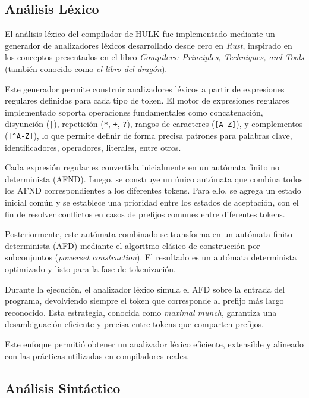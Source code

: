 \documentclass{article}
\begin{document}
\subsection{Análisis Léxico}

El análisis léxico del compilador de HULK fue implementado mediante un generador de analizadores léxicos desarrollado desde cero en \textit{Rust}, inspirado en los conceptos presentados en el libro \textit{Compilers: Principles, Techniques, and Tools} (también conocido como \textit{el libro del dragón}).

Este generador permite construir analizadores léxicos a partir de expresiones regulares definidas para cada tipo de token. El motor de expresiones regulares implementado soporta operaciones fundamentales como concatenación, disyunción (\texttt{|}), repetición (\texttt{*}, \texttt{+}, \texttt{?}), rangos de caracteres (\texttt{[A-Z]}), y complementos (\texttt{[\^{}A-Z]}), lo que permite definir de forma precisa patrones para palabras clave, identificadores, operadores, literales, entre otros.

Cada expresión regular es convertida inicialmente en un autómata finito no determinista (AFND). Luego, se construye un único autómata que combina todos los AFND correspondientes a los diferentes tokens. Para ello, se agrega un estado inicial común y se establece una prioridad entre los estados de aceptación, con el fin de resolver conflictos en casos de prefijos comunes entre diferentes tokens.

Posteriormente, este autómata combinado se transforma en un autómata finito determinista (AFD) mediante el algoritmo clásico de construcción por subconjuntos (\textit{powerset construction}). El resultado es un autómata determinista optimizado y listo para la fase de tokenización.

Durante la ejecución, el analizador léxico simula el AFD sobre la entrada del programa, devolviendo siempre el token que corresponde al prefijo más largo reconocido. Esta estrategia, conocida como \textit{maximal munch}, garantiza una desambiguación eficiente y precisa entre tokens que comparten prefijos.

Este enfoque permitió obtener un analizador léxico eficiente, extensible y alineado con las prácticas utilizadas en compiladores reales.

\subsection{Análisis Sintáctico}
\end{document}
